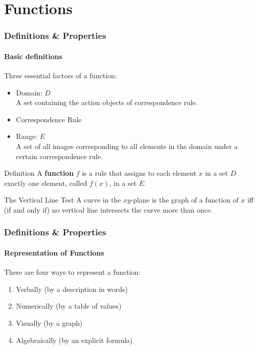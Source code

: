 \section{Functions}

\begin{frame}
    \frametitle{Definitions \& Properties}
    \framesubtitle{Basic definitions}
    Three essential factors of a function:
    \begin{itemize}
        \item Domain: $D$\\A set containing the action objects of correspondence rule.
        \item Correspondence Rule
        \item Range: $E$\\ A set of all images corresponding to all elements in the domain under a certain correspondence rule.
    \end{itemize}
    \begin{block}{Definition}
        A \textbf{function} $f$ is a rule that assigns to \alert{each element} $x$ in a set $D$ exactly one element, called $f(x)$, in a set $E$.
    \end{block}
    \begin{block}{The Vertical Line Test}
        A curve in the $xy$-plane is the graph of a function of $x$ \alert{iff} (if and only if) no vertical line intersects the curve more than once.
    \end{block}
\end{frame}

\begin{frame}
    \frametitle{Definitions \& Properties}
    \framesubtitle{Representation of Functions}
    There are four ways to represent a function:
    \begin{enumerate}
        \item Verbally (by a description in words)
        \item Numerically (by a table of values)
        \item Visually (by a graph)
        \item Algebraically (by an explicit formula)
    \end{enumerate}
\end{frame}

